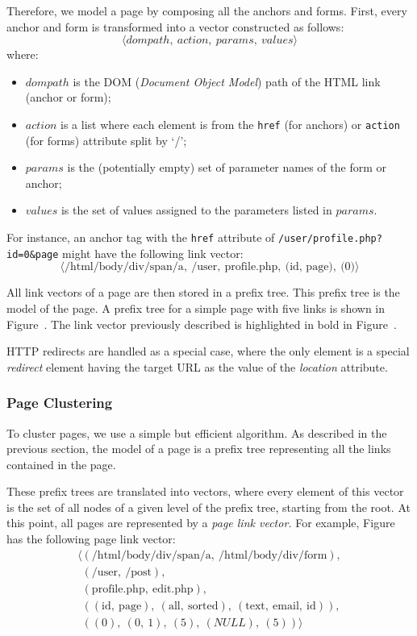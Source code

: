 Therefore, we model a page by composing all the anchors and forms. First, every
anchor and form is transformed into a vector constructed as follows:
\[
\langle{}dompath,\ action,\ params,\ values\rangle{}
\]
where:
\begin{itemize}
 \item $dompath$ is the DOM (\emph{Document Object Model}) path of the HTML
  link (anchor or form);
 \item $action$ is a list where each element is from the \texttt{href} (for anchors) or
  \texttt{action} (for forms) attribute split by `/';
 \item $params$ is the (potentially empty) set of parameter names of the form
   or anchor;
 \item $values$ is the set of values assigned to the parameters listed in
   $params$.
\end{itemize}

\noindent{}For instance, an anchor tag with the \texttt{href} attribute of
\texttt{/user/profile.php?id=0\&page} might have the following link vector:%
\[\langle{}\text{/html/body/div/span/a},\ \text{/user},\ \text{profile.php},\ \text{(id,
  page)},\ \text{(0)}\rangle{}\] 

All link vectors of a page are then stored in a prefix tree. This prefix tree
is the model of the page. A prefix tree for a simple page with five links is
shown in Figure~. The link vector previously described is
highlighted in bold in Figure~.

HTTP redirects are handled as a special case, where the only element is a
special \emph{redirect} element having the target URL as the value of the
\emph{location} attribute.

\subsubsection{Page Clustering}

To cluster pages, we use a simple but efficient algorithm. As described in the
previous section, the model of a page is a prefix tree representing all the links
contained in the page.

These prefix trees are translated into vectors, where every element of this
vector is the set of all nodes of a given level of the prefix tree, starting
from the root. At this point, all pages are represented by a \emph{page link
  vector.} For example, Figure~ has the following page
link vector:
\[
\begin{array}{l}
\langle{}(\text{/html/body/div/span/a},\ \text{/html/body/div/form}), \\
\phantom{\langle{}}(\text{/user},\ \text{/post}), \\
\phantom{\langle{}}(\text{profile.php},\ \text{edit.php}), \\
\phantom{\langle{}}((\text{id},\ \text{page}),\ (\text{all},\ \text{sorted}),\ (\text{text},\ \text{email},\ \text{id})), \\
\phantom{\langle{}}((0),\ (0,\ 1),\ (5),\ (NULL),\ (5))\rangle{} \\
\end{array}
\]

